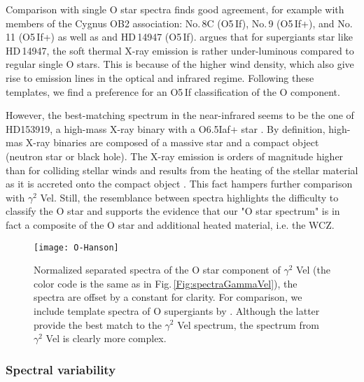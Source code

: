 \documentclass[usenatbib]{mnras}%
\begin{document}
Comparison with single O star spectra finds good agreement, for example with members of the Cygnus OB2 association: No.\,8C (O5\,If), No.\,9 (O5\,If+), and No.\,11 (O5\,If+) as well as and HD\,14947 (O5\,If). \citet{2013NewA...25....7D} argues that for  supergiants star like HD\,14947, the soft thermal X-ray emission is rather under-luminous  compared to regular single O stars. This is  because of the higher wind density, which also give rise to emission lines in the optical and infrared regime. Following these templates, we find a preference for an O5\,If classification of the O component. 

However, the best-matching spectrum in the near-infrared seems to be the one of HD153919, a high-mass X-ray binary with a  O6.5Iaf+ star \citep{1973ApJ...181L..43J}. By definition, high-mas X-ray binaries are composed of a massive star and a compact object (neutron star or black hole). The X-ray emission is orders of magnitude higher than for colliding stellar winds and results from the heating of the stellar material as it is accreted onto the compact object \citep[see e.g.][and references therein]{2015MNRAS.448..620J}. This fact hampers  further comparison with $\gamma^2$ Vel.  Still, the resemblance between spectra highlights the difficulty to classify the O star and supports the evidence that our "O star spectrum" is in fact a composite of the O star and additional heated material, i.e. the WCZ.

\begin{figure*}
\centering
\texttt{[image: O-Hanson]} 
  \caption{
  Normalized separated spectra of the O star component of $\gamma^2$ Vel (the color code is the same as in Fig.\,\ref{Fig:spectraGammaVel}), the spectra are offset by a constant for clarity. For comparison, we include template spectra of O supergiants by \citet{1996ApJS..107..281H,2005ApJS..161..154H}. Although the latter provide the best match to the $\gamma^2$ Vel spectrum, the spectrum from $\gamma^2$ Vel is clearly more complex. }
\label{Fig:spectraGammaVelO}
\end{figure*}

\subsubsection{Spectral variability}
\end{document}
